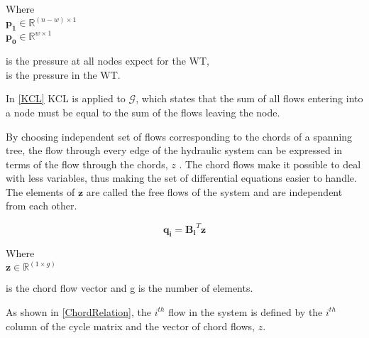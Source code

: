 \begin{minipage}[t]{0.24\textwidth}
Where\\
\hspace*{8mm} $\bm{p_1} \in \mathbb{R}^{(n-w) \times 1}$  \\
\hspace*{8mm} $\bm{p_0} \in \mathbb{R}^{w \times 1} $ 
\end{minipage}
\begin{minipage}[t]{0.68\textwidth}
\vspace*{2mm}
\hspace*{4mm} is the pressure at all nodes expect for the WT,\\
\hspace*{4mm} is the pressure in the WT.
\end{minipage}

In \eqref{KCL} KCL is applied to $\mathcal{G}$, which states that the sum of all flows entering into a node must be equal to the sum of the flows leaving the node.

By choosing independent set of flows corresponding to the chords of a spanning tree, the flow through every edge of the hydraulic system can be expressed in terms of the flow through the chords, $z$ \cite{GraphModel}.
The chord flows make it possible to deal with less variables, thus making the set of differential equations easier to handle.  The elements of $\bm{z}$ are called the free flows of the system and are independent from each other\cite{GraphTheoryCarsten}.

\begin{equation}
  \bm{q_i} = \bm{B_i} ^{T}  \bm{z}
  \label{ChordRelation}
\end{equation}

\begin{minipage}[t]{0.20\textwidth}
Where\\
\hspace*{8mm} $\bm{z} \in \mathbb{R}^{(1 \times g)} $ 
\end{minipage}
\begin{minipage}[t]{0.68\textwidth}
\vspace*{2mm}
\hspace*{4mm} is the chord flow vector and g is the number of elements.
\end{minipage}

As shown in \eqref{ChordRelation}, the $i^{th}$ flow in the system is defined by the $i^{th}$ column of the cycle matrix and the vector of chord flows, $z$. 
\\


